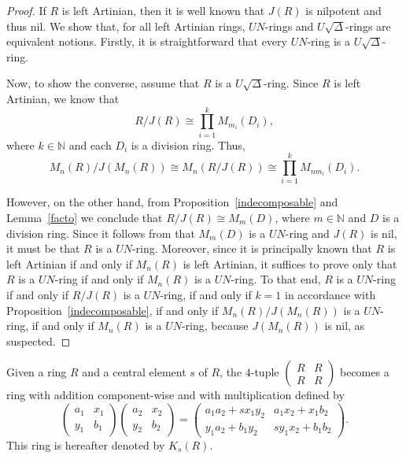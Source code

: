 \documentclass[11pt]{amsart}
\theoremstyle{definition}
\begin{document}
\begin{proof}
If \( R \) is left Artinian, then it is well known that \( J(R) \) is nilpotent and thus nil. We show that, for all left Artinian rings, $UN$-rings and $U\sqrt{\Delta}$-rings are equivalent notions. Firstly, it is straightforward that every $UN$-ring is a $U\sqrt{\Delta}$-ring.

Now, to show the converse, assume that $R$ is a $U\sqrt{\Delta}$-ring. Since $R$ is left Artinian, we know that $$R/J(R) \cong \prod_{i=1}^k M_{m_i}(D_i),$$ where $k\in\mathbb{N}$ and each $D_i$ is a division ring. Thus, $$M_n(R)/J(M_n(R)) \cong M_n(R/J(R)) \cong \prod_{i=1}^{k}M_{nm_i}(D_i).$$

However, on the other hand, from Proposition~\ref{indecomposable} and Lemma~\ref{facto} we conclude that $R/J(R) \cong M_m(D)$, where $m\in\mathbb{N}$ and $D$ is a division ring. Since it follows from \cite[Proposition~0(a)]{vun} that $M_m(D)$ is a $UN$-ring and $J(R)$ is nil, it must be that $R$ is a $UN$-ring. Moreover, since it is principally known that \( R \) is left Artinian if and only if \( M_n(R) \) is left Artinian, it suffices to prove only that \( R \) is a $UN$-ring if and only if \( M_n(R) \) is a $UN$-ring. To that end, $R$ is a $UN$-ring if and only if $R/J(R)$ is a $UN$-ring, if and only if $k=1$ in accordance with Proposition~\ref{indecomposable}, if and only if
$M_n(R)/J(M_n(R))$ is a $UN$-ring, if and only if $M_n(R)$ is a $UN$-ring, because $J(M_n(R))$ is nil, as suspected.
\end{proof}


Given a ring $R$ and a central element $s$ of $R$, the $4$-tuple $\begin{pmatrix}
	R & R\\
	R & R
\end{pmatrix}$ becomes a ring with addition component-wise and with multiplication defined by
$$\begin{pmatrix}
	a_{1} & x_{1}\\
	y_{1} & b_{1}
\end{pmatrix}\begin{pmatrix}
	a_{2} & x_{2}\\
	y_{2} & b_{2}
\end{pmatrix}=\begin{pmatrix}
	a_{1}a_{2}+sx_{1}y_{2} & a_{1}x_{2}+x_{1}b_{2} \\
	y_{1}a_{2}+b_{1}y_{2} & sy_{1}x_{2}+b_{1}b_{2}
\end{pmatrix}.$$
This ring is hereafter denoted by $K_s(R)$.
\end{document}

